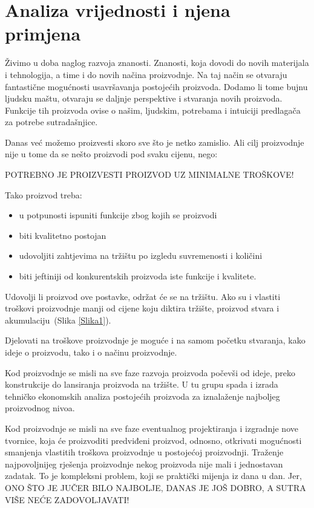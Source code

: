 \documentclass[a4paper,12pt]{article}
\numberwithin{figure}{section}
\begin{document}
\section*{Analiza vrijednosti i njena primjena}
Živimo u doba naglog razvoja znanosti. Znanosti, koja dovodi do novih materijala i tehnologija, a time i do novih načina proizvodnje. Na taj način se otvaraju fantastične mogućnosti usavršavanja postojećih proizvoda. Dodamo li tome bujnu ljudsku maštu, otvaraju se daljnje perspektive i stvaranja novih proizvoda. Funkcije tih proizvoda ovise o našim, ljudskim, potrebama i intuiciji predlagača za potrebe sutradašnjice.\par
Danas već možemo proizvesti skoro sve što je netko zamislio. Ali cilj proizvodnje nije u tome da se nešto proizvodi pod svaku cijenu, nego:
\begin{center}
POTREBNO JE PROIZVESTI PROIZVOD UZ MINIMALNE TROŠKOVE!
\end{center}
\noindent Tako proizvod treba:
\begin{itemize}
	\item u potpunosti ispuniti funkcije zbog kojih se proizvodi
	\item biti kvalitetno postojan
	\item udovoljiti zahtjevima na tržištu po izgledu suvremenosti i količini
	\item biti jeftiniji od konkurentskih proizvoda iste funkcije i kvalitete.
\end{itemize}
\noindent Udovolji li proizvod ove postavke, održat će se na tržištu. Ako su i vlastiti troškovi proizvodnje manji od cijene koju diktira tržište, proizvod stvara i akumulaciju~(Slika \ref{Slika1}). \par
Djelovati na troškove proizvodnje je moguće i na samom početku stvaranja, kako ideje o proizvodu, tako i o načinu proizvodnje. \par
Kod proizvodnje se misli na sve faze razvoja proizvoda počevši od ideje, preko konstrukcije do lansiranja proizvoda na tržište. U tu grupu spada i izrada tehničko ekonomskih analiza postojećih proizvoda za iznalaženje najboljeg proizvodnog nivoa. \par
Kod proizvodnje se misli na sve faze eventualnog projektiranja i izgradnje nove tvornice, koja će proizvoditi predviđeni proizvod, odnosno, otkrivati mogućnosti smanjenja vlastitih troškova proizvodnje u postojećoj proizvodnji. Traženje najpovoljnijeg rješenja proizvodnje nekog proizvoda nije mali i jednostavan zadatak. To je kompleksni problem, koji se praktički mijenja iz dana u dan. Jer, ONO ŠTO JE JUČER BILO NAJBOLJE, DANAS JE JOŠ DOBRO, A SUTRA VIŠE NEĆE ZADOVOLJAVATI!
\end{document}
